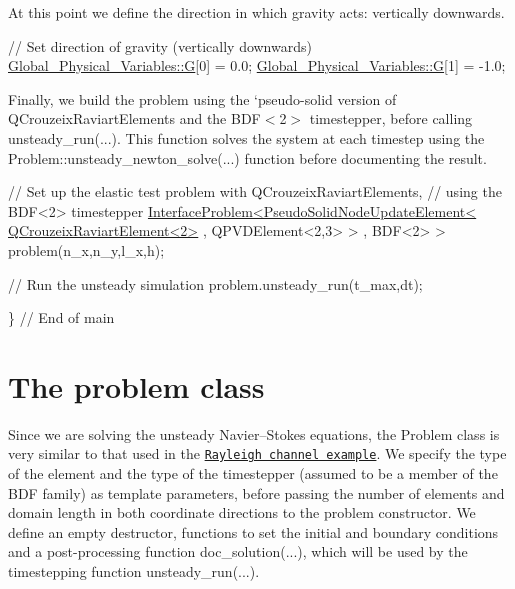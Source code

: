 At this point we define the direction in which gravity acts\+: vertically downwards.


\begin{DoxyCodeInclude}
 \textcolor{comment}{// Set direction of gravity (vertically downwards)}
 \hyperlink{namespaceGlobal__Physical__Variables_a37a6f46efcb35b4bd12c73f19d741020}{Global\_Physical\_Variables::G}[0] = 0.0;
 \hyperlink{namespaceGlobal__Physical__Variables_a37a6f46efcb35b4bd12c73f19d741020}{Global\_Physical\_Variables::G}[1] = -1.0;

\end{DoxyCodeInclude}


Finally, we build the problem using the `pseudo-\/solid\textquotesingle{} version of {\ttfamily Q\+Crouzeix\+Raviart\+Elements} and the {\ttfamily B\+D\+F$<$2$>$} timestepper, before calling {\ttfamily unsteady\+\_\+run}(...). This function solves the system at each timestep using the {\ttfamily Problem\+::unsteady\+\_\+newton\+\_\+solve}(...) function before documenting the result.


\begin{DoxyCodeInclude}
 \textcolor{comment}{// Set up the elastic test problem with QCrouzeixRaviartElements,}
 \textcolor{comment}{// using the BDF<2> timestepper}
 \hyperlink{classInterfaceProblem}{InterfaceProblem<PseudoSolidNodeUpdateElement< QCrouzeixRaviartElement<2>}
      ,
  QPVDElement<2,3> > , BDF<2> >
  problem(n\_x,n\_y,l\_x,h);
 
 \textcolor{comment}{// Run the unsteady simulation}
 problem.unsteady\_run(t\_max,dt);
 
\} \textcolor{comment}{// End of main}

\end{DoxyCodeInclude}




 

\hypertarget{index_problem_class}{}\section{The problem class}\label{index_problem_class}
Since we are solving the unsteady Navier--Stokes equations, the {\ttfamily Problem} class is very similar to that used in the \href{../../rayleigh_channel/html/index.html}{\tt Rayleigh channel example}. We specify the type of the element and the type of the timestepper (assumed to be a member of the {\ttfamily B\+DF} family) as template parameters, before passing the number of elements and domain length in both coordinate directions to the problem constructor. We define an empty destructor, functions to set the initial and boundary conditions and a post-\/processing function {\ttfamily doc\+\_\+solution}(...), which will be used by the timestepping function {\ttfamily unsteady\+\_\+run}(...).

